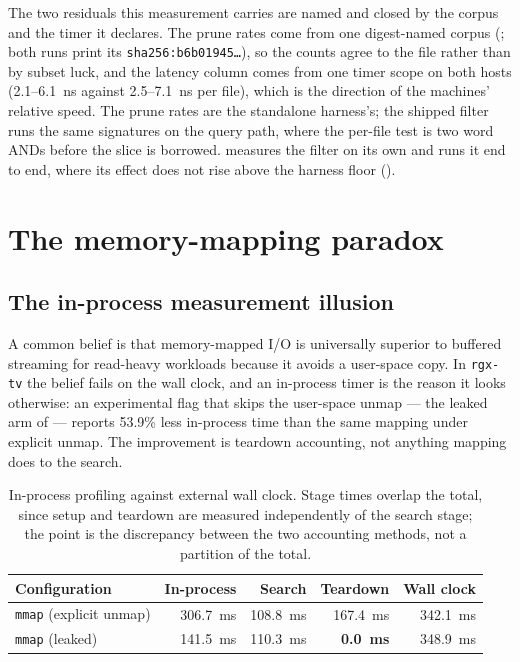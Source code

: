 \documentclass[11pt,letterpaper]{article}
\begin{document}
The two residuals this measurement carries are named and closed by the
corpus and the timer it declares. The prune rates come from one
digest-named corpus (; both runs
print its \texttt{sha256:b6b01945\ldots}), so the counts agree to the file
rather than by subset luck, and the latency column comes from one timer
scope on both hosts (2.1--6.1~ns against 2.5--7.1~ns per file), which is
the direction of the machines' relative speed. The prune rates are the
standalone harness's; the shipped
filter runs the same signatures on the query path, where the per-file test
is two word ANDs before the slice is borrowed.  measures the
filter on its own and  runs it end to end, where its effect
does not rise above the harness floor ().

\section{The memory-mapping paradox}
\label{sec:mmap}

\subsection{The in-process measurement illusion}
A common belief is that memory-mapped I/O is universally superior to buffered
streaming for read-heavy workloads because it avoids a user-space copy. In
\texttt{rgx-tv} the belief fails on the wall clock, and an in-process timer
is the reason it looks otherwise: an experimental flag that skips the
user-space unmap --- the leaked arm of  --- reports 53.9\%
less in-process time than the same mapping under explicit unmap. The
improvement is teardown accounting, not anything mapping does to the search.

\begin{table}[htbp]
\centering
\footnotesize
\caption{In-process profiling against external wall clock. Stage times
overlap the total, since setup and teardown are measured independently of
the search stage; the point is the discrepancy between the two accounting
methods, not a partition of the total.}
\label{tab:unmap}
\begin{tabular}{@{}lrrrr@{}}
\toprule
\textbf{Configuration} & \textbf{In-process} & \textbf{Search}
  & \textbf{Teardown} & \textbf{Wall clock} \\
\midrule
\texttt{mmap} (explicit unmap) & 306.7~ms & 108.8~ms & 167.4~ms & 342.1~ms \\
\texttt{mmap} (leaked)         & 141.5~ms & 110.3~ms & \textbf{0.0~ms} & 348.9~ms \\
\bottomrule
\end{tabular}
\end{table}
\end{document}
